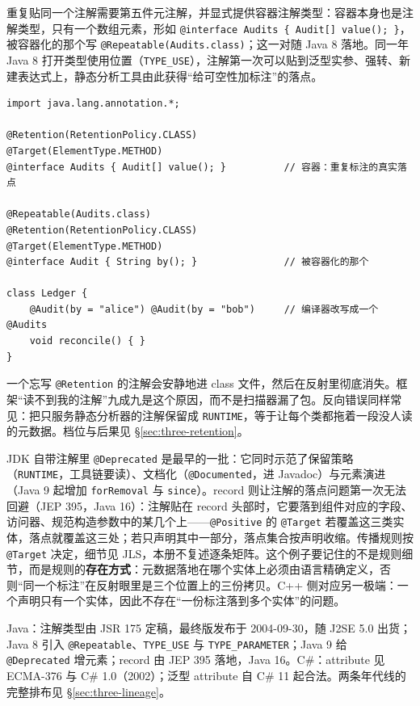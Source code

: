 \documentclass[12pt,a4paper,fontset=fandol]{ctexbook}
\newcommand{\javalabel}{%
  \tcbox[on line,colback=javaheadbg,colframe=javaheadbg,
    boxrule=0pt,arc=1pt,left=2pt,right=2pt,top=1pt,bottom=1pt,
    colupper=white,fontupper=\scriptsize\bfseries]{Java}}
\newcommand{\cpp}[1]{C++#1}
\begin{document}
重复贴同一个注解需要第五件元注解，并显式提供容器注解类型：容器本身也是注解类型，只有一个数组元素，形如 \texttt{@interface Audits \{ Audit[] value(); \}}，被容器化的那个写 \texttt{@Repeatable(Audits.class)}；这一对随 Java 8 落地。同一年 Java 8 打开类型使用位置（\texttt{TYPE\_USE}），注解第一次可以贴到泛型实参、强转、新建表达式上，静态分析工具由此获得“给可空性加标注”的落点。

\javalabel
\begin{lstlisting}[style=javastyle,caption={@Repeatable 与容器注解类型（Java 8）：容器只有一个数组元素},label={lst:ch3-java-repeat}]
import java.lang.annotation.*;

@Retention(RetentionPolicy.CLASS)
@Target(ElementType.METHOD)
@interface Audits { Audit[] value(); }          // 容器：重复标注的真实落点

@Repeatable(Audits.class)
@Retention(RetentionPolicy.CLASS)
@Target(ElementType.METHOD)
@interface Audit { String by(); }               // 被容器化的那个

class Ledger {
    @Audit(by = "alice") @Audit(by = "bob")     // 编译器改写成一个 @Audits
    void reconcile() { }
}
\end{lstlisting}

\begin{warning}[title={缺省保留策略是 CLASS，不是 RUNTIME}]
一个忘写 \texttt{@Retention} 的注解会安静地进 class 文件，然后在反射里彻底消失。框架“读不到我的注解”九成九是这个原因，而不是扫描器漏了包。反向错误同样常见：把只服务静态分析器的注解保留成 \texttt{RUNTIME}，等于让每个类都拖着一段没人读的元数据。档位与后果见 \S\ref{sec:three-retention}。
\end{warning}

JDK 自带注解里 \texttt{@Deprecated} 是最早的一批：它同时示范了保留策略（\texttt{RUNTIME}，工具链要读）、文档化（\texttt{@Documented}，进 Javadoc）与元素演进（Java 9 起增加 \texttt{forRemoval} 与 \texttt{since}）。record 则让注解的落点问题第一次无法回避（JEP 395，Java 16）：注解贴在 record 头部时，它要落到组件对应的字段、访问器、规范构造参数中的某几个上——\texttt{@Positive} 的 \texttt{@Target} 若覆盖这三类实体，落点就覆盖这三处；若只声明其中一部分，落点集合按声明收缩。传播规则按 \texttt{@Target} 决定，细节见 JLS，本册不复述逐条矩阵。这个例子要记住的不是规则细节，而是规则的\textbf{存在方式}：元数据落地在哪个实体上必须由语言精确定义，否则“同一个标注”在反射眼里是三个位置上的三份拷贝。\cpp{} 侧对应另一极端：一个声明只有一个实体，因此不存在“一份标注落到多个实体”的问题。

\begin{stdbox}[title={规范坐标}]
Java：注解类型由 JSR 175 定稿，最终版发布于 2004-09-30，随 J2SE 5.0 出货；Java 8 引入 \texttt{@Repeatable}、\texttt{TYPE\_USE} 与 \texttt{TYPE\_PARAMETER}；Java 9 给 \texttt{@Deprecated} 增元素；record 由 JEP 395 落地，Java 16。C\#：attribute 见 ECMA-376 与 C\# 1.0（2002）；泛型 attribute 自 C\# 11 起合法。两条年代线的完整排布见 \S\ref{sec:three-lineage}。
\end{stdbox}
\end{document}
